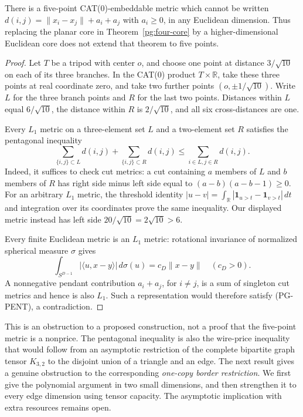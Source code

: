 \begin{proposition}
\label{pg:five-nonlone}
There is a five-point CAT(0)-embeddable metric which cannot be written
$d(i,j)=\|x_i-x_j\|+a_i+a_j$ with $a_i\geq0$, in any Euclidean
dimension. Thus replacing the planar core in Theorem~\ref{pg:four-core}
by a higher-dimensional Euclidean core does not extend that theorem to
five points.
\end{proposition}
\begin{proof}
Let $T$ be a tripod with center $o$, and choose one point at distance
$3/\sqrt{10}$ on each of its three branches. In the CAT(0) product
$T\times\mathbb R$, take these three points at real coordinate zero,
and take two further points $(o,\pm1/\sqrt{10})$. Write $L$ for the
three branch points and $R$ for the last two points. Distances within
$L$ equal $6/\sqrt{10}$, the distance within $R$ is $2/\sqrt{10}$,
and all six cross-distances are one.

Every $L_1$ metric on a three-element set $L$ and a two-element set $R$
satisfies the pentagonal inequality
\[
 \sum_{\{i,j\}\subset L}d(i,j)+
 \sum_{\{i,j\}\subset R}d(i,j)
 \leq \sum_{i\in L,j\in R}d(i,j).
 \tag{PG-PENT}
\]
Indeed, it suffices to check cut metrics: a cut containing $a$ members
of $L$ and $b$ members of $R$ has right side minus left side equal to
$(a-b)(a-b-1)\geq0$. For an arbitrary $L_1$ metric, the threshold
identity
$|u-v|=\int_{\mathbb R}|\mathbf1_{u>t}-\mathbf1_{v>t}|\,dt$
and integration over its coordinates prove the same inequality.
Our displayed metric instead has left side $20/\sqrt{10}=2\sqrt{10}>6$.

Every finite Euclidean metric is an $L_1$ metric: rotational invariance
of normalized spherical measure $\sigma$ gives
\[
 \int_{S^{D-1}}|\langle u,x-y\rangle|\,d\sigma(u)
 =c_D\|x-y\|\quad(c_D>0).
\]
A nonnegative pendant contribution $a_i+a_j$, for $i\ne j$, is a sum
of singleton cut metrics and hence is also $L_1$. Such a representation
would therefore satisfy (PG-PENT), a contradiction.
\end{proof}

This is an obstruction to a proposed construction, not a proof that the
five-point metric is a nonprice. The pentagonal inequality is also the
wire-price inequality that would follow from an asymptotic restriction
of the complete bipartite graph tensor $K_{3,2}$ to the disjoint union
of a triangle and an edge. The next result gives a genuine obstruction
to the corresponding \emph{one-copy border restriction}. We first give
the polynomial argument in two small dimensions, and then strengthen
it to every edge dimension using tensor capacity. The asymptotic
implication with extra resources remains open.

